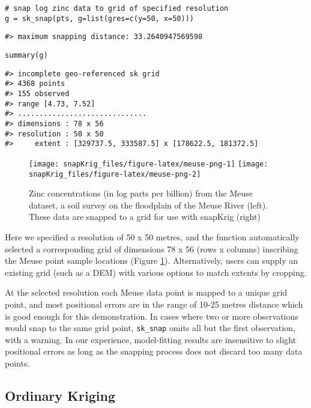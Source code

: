 \begin{verbatim}
# snap log zinc data to grid of specified resolution
g = sk_snap(pts, g=list(gres=c(y=50, x=50)))
\end{verbatim}

\begin{verbatim}
#> maximum snapping distance: 33.2640947569598
\end{verbatim}

\begin{verbatim}
summary(g)
\end{verbatim}

\begin{verbatim}
#> incomplete geo-referenced sk grid
#> 4368 points
#> 155 observed
#> range [4.73, 7.52]
#> ..............................
#> dimensions : 78 x 56
#> resolution : 50 x 50
#>     extent : [329737.5, 333587.5] x [178622.5, 181372.5]
\end{verbatim}

\begin{figure}
\texttt{[image: snapKrig\_files/figure-latex/meuse-png-1]} \texttt{[image: snapKrig\_files/figure-latex/meuse-png-2]} \caption{Zinc concentrations (in log parts per billion) from the Meuse dataset, a soil survey on the floodplain of the Meuse River (left). These data are snapped to a grid for use with snapKrig (right)}\label{fig:meuse-png}
\end{figure}

Here we specified a resolution of 50 x 50 metres, and the function automatically selected a corresponding grid of dimensions 78 x 56 (rows x columns) inscribing the Meuse point sample locations (Figure \ref{fig:meuse-png}). Alternatively, users can supply an existing grid (such as a DEM) with various options to match extents by cropping.

At the selected resolution each Meuse data point is mapped to a unique grid point, and most positional errors are in the range of 10-25 metres distance which is good enough for this demonstration. In cases where two or more observations would snap to the same grid point, \texttt{sk\_snap} omits all but the first observation, with a warning. In our experience, model-fitting results are insensitive to slight positional errors as long as the snapping process does not discard too many data points.

\hypertarget{ordinary-kriging}{%
\subsection{Ordinary Kriging}\label{ordinary-kriging}}

